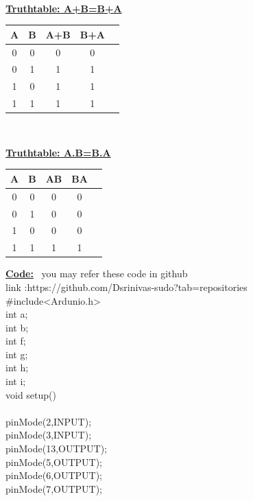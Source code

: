 \documentclass[letterpaper, 10 pt, conference]{ieeeconf}
\begin{document}
\vspace{7mm}
\\ \raggedright \textbf{\underline{Truthtable: A+B=B+A}}\vspace{2mm}
\begin{table}[ht]
\centering %
\begin{tabular}{c c c c c} %
\hline\hline %
 \textbf{A} & \textbf{B} & \textbf{A+B} &\textbf{B+A}\\ [0.5ex] %
\hline
      0 & 0 & 0 & 0\\
      0 & 1 & 1 & 1\\
      1 & 0 & 1 & 1\\
      1 & 1 & 1 & 1\\
\hline
\end{tabular}
\end{table}
\\ \raggedright \textbf{\underline{Truthtable: A.B=B.A}}\vspace{2mm}
\begin{table}[ht]
\centering %
\begin{tabular}{c c c c c} %
\hline\hline %
  \textbf{A} & \textbf{B} & \textbf{AB} &\textbf{BA}\\ [0.5ex] %
\hline
      0 & 0 & 0 & 0\\
      0 & 1 & 0 & 0\\
      1 & 0 & 0 & 0\\
      1 & 1 & 1 & 1\\
\hline
\end{tabular}
\end{table}
\raggedright \textbf{\underline{Code:}}\vspace{7mm}
\ you may  refer these code in github
\\ link    :https://github.com/Dsrinivas-sudo?tab=repositories
\\#include<Ardunio.h>
\\int a;
\\int b;
\\int f;
\\int g;
\\int h;
\\int i;
\\void setup()
\\{
\\pinMode(2,INPUT);
\\pinMode(3,INPUT);
\\pinMode(13,OUTPUT);
\\pinMode(5,OUTPUT);
\\pinMode(6,OUTPUT);
\\pinMode(7,OUTPUT);
\\}
\end{document}
